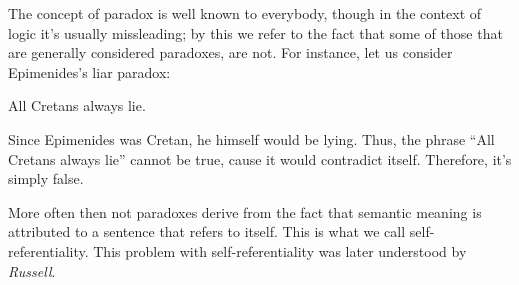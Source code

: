 \documentclass{subfiles}
\begin{document}
    The concept of paradox is well known to everybody, 
        though in the context of logic it's usually missleading;
        by this we refer to the fact that some of those that are generally considered paradoxes, are not.
        For instance, let us consider Epimenides's liar paradox:
        \begin{quote*}
            All Cretans always lie.
        \end{quote*}
        Since Epimenides was Cretan, he himself would be lying.
        Thus, the phrase ``All Cretans always lie'' cannot be true, 
        cause it would contradict itself. Therefore, it's simply false.

    More often then not paradoxes derive from the fact that semantic meaning is attributed 
        to a sentence that refers to itself. This is what we call self-referentiality.
        This problem with self-referentiality was later understood by \emph{Russell}.
\end{document}
